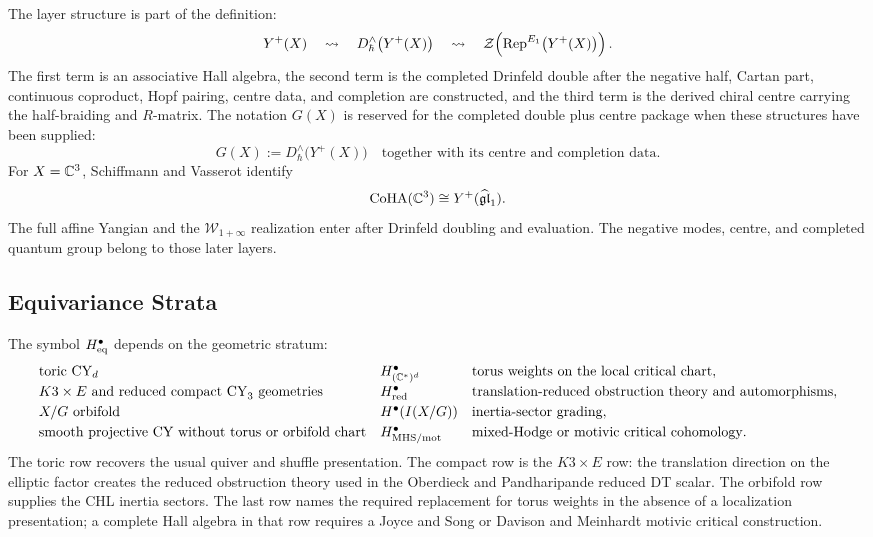 The layer structure is part of the definition:
\[
Y^{+}(X)
\quad\leadsto\quad
D_{\hbar}^{\wedge}\bigl(Y^{+}(X)\bigr)
\quad\leadsto\quad
\mathcal{Z}\!\left(\mathrm{Rep}^{E_1}\bigl(Y^{+}(X)\bigr)\right).
\]
The first term is an associative Hall algebra, the second term is the
completed Drinfeld double after the negative half, Cartan part,
continuous coproduct, Hopf pairing, centre data, and completion are
constructed, and the third term is the derived chiral centre carrying
the half-braiding and \(R\)-matrix. The notation \(G(X)\) is reserved
for the completed double plus centre package when these structures have
been supplied:
\[
 G(X) := D_{\hbar}^{\wedge}\bigl(Y^{+}(X)\bigr)
 \quad\text{together with its centre and completion data.}
\]
For \(X=\mathbb{C}^3\), Schiffmann and Vasserot identify
\[
 \mathrm{CoHA}(\mathbb{C}^3)\cong Y^{+}(\widehat{\mathfrak{gl}}_1).
\]
The full affine Yangian and the \(\mathcal W_{1+\infty}\) realization
enter after Drinfeld doubling and evaluation. The negative modes,
centre, and completed quantum group belong to those later layers.

\subsection*{Equivariance Strata}
\label{note:equivariance-strata}

The symbol \(H^{\bullet}_{\mathrm{eq}}\) depends on the geometric stratum:
\[
\begin{array}{lll}
\text{toric CY}_d
& H^\bullet_{(\mathbb{C}^*)^d}
& \text{torus weights on the local critical chart},\\[0.25em]
K3\times E\text{ and reduced compact CY}_3\text{ geometries}
& H^\bullet_{\mathrm{red}}
& \text{translation-reduced obstruction theory and automorphisms},\\[0.25em]
X/G\text{ orbifold}
& H^\bullet(I(X/G))
& \text{inertia-sector grading},\\[0.25em]
\text{smooth projective CY without torus or orbifold chart}
& H^\bullet_{\mathrm{MHS/mot}}
& \text{mixed-Hodge or motivic critical cohomology}.
\end{array}
\]
The toric row recovers the usual quiver and shuffle presentation. The
compact row is the \(K3\times E\) row: the translation direction on the
elliptic factor creates the reduced obstruction theory used in the
Oberdieck and Pandharipande reduced DT scalar. The orbifold row supplies
the CHL inertia sectors. The last row names the required replacement
for torus weights in the absence of a localization presentation; a
complete Hall algebra in that row requires a Joyce and Song or Davison
and Meinhardt motivic critical construction.

